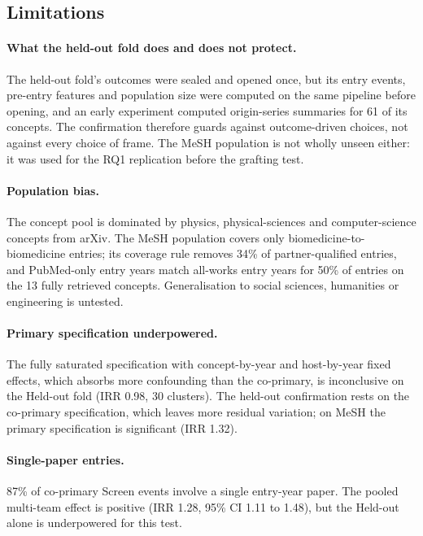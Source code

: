 \documentclass[11pt,letterpaper]{article}
\begin{document}
\subsection{Limitations}
\label{sec:limitations}

\paragraph{What the held-out fold does and does not protect.} The held-out fold's outcomes were sealed and
opened once, but its entry events, pre-entry features and population size were computed on the same pipeline
before opening, and an early experiment computed origin-series summaries for 61 of its concepts. The
confirmation therefore guards against outcome-driven choices, not against every choice of frame. The MeSH
population is not wholly unseen either: it was used for the RQ1 replication before the grafting test.

\paragraph{Population bias.} The concept pool is dominated by physics, physical-sciences and computer-science
concepts from arXiv. The MeSH population covers only biomedicine-to-biomedicine entries; its coverage rule removes 34\% of
partner-qualified entries, and PubMed-only entry years match all-works entry years for 50\% of entries on the
13 fully retrieved concepts. Generalisation to social sciences, humanities or engineering is untested.

\paragraph{Primary specification underpowered.} The fully saturated specification with concept-by-year and
host-by-year fixed effects, which absorbs more confounding than the co-primary, is inconclusive on the Held-out
fold (IRR 0.98, 30 clusters). The held-out confirmation rests on the co-primary specification, which leaves
more residual variation; on MeSH the primary specification is significant (IRR 1.32).

\paragraph{Single-paper entries.} 87\% of co-primary Screen events involve a single entry-year paper. The
pooled multi-team effect is positive (IRR 1.28, 95\% CI 1.11 to 1.48), but the Held-out alone is underpowered
for this test.
\end{document}
